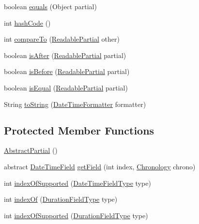 \begin{DoxyCompactItemize}
boolean \hyperlink{classorg_1_1joda_1_1time_1_1base_1_1_abstract_partial_abb989d9628c610b8eb46f92b2fe1c846}{equals} (Object partial)
\item 
int \hyperlink{classorg_1_1joda_1_1time_1_1base_1_1_abstract_partial_aa3435c9b8ceed4256678e3c666dd2ee1}{hash\-Code} ()
\item 
int \hyperlink{classorg_1_1joda_1_1time_1_1base_1_1_abstract_partial_a5fd48b43fedd6d26fa8c31cb4c20a107}{compare\-To} (\hyperlink{interfaceorg_1_1joda_1_1time_1_1_readable_partial}{Readable\-Partial} other)
\item 
boolean \hyperlink{classorg_1_1joda_1_1time_1_1base_1_1_abstract_partial_aca0ae287941e889d657f66e97fbed4f0}{is\-After} (\hyperlink{interfaceorg_1_1joda_1_1time_1_1_readable_partial}{Readable\-Partial} partial)
\item 
boolean \hyperlink{classorg_1_1joda_1_1time_1_1base_1_1_abstract_partial_a933d079d4a4c8c57fe8c229d93eb82d8}{is\-Before} (\hyperlink{interfaceorg_1_1joda_1_1time_1_1_readable_partial}{Readable\-Partial} partial)
\item 
boolean \hyperlink{classorg_1_1joda_1_1time_1_1base_1_1_abstract_partial_a006731cb214ca704c7e4e9c38dd149a5}{is\-Equal} (\hyperlink{interfaceorg_1_1joda_1_1time_1_1_readable_partial}{Readable\-Partial} partial)
\item 
String \hyperlink{classorg_1_1joda_1_1time_1_1base_1_1_abstract_partial_a81c28665ed42368cc92e5cb986d10e74}{to\-String} (\hyperlink{classorg_1_1joda_1_1time_1_1format_1_1_date_time_formatter}{Date\-Time\-Formatter} formatter)
\end{DoxyCompactItemize}
\subsection*{Protected Member Functions}
\begin{DoxyCompactItemize}
\item 
\hyperlink{classorg_1_1joda_1_1time_1_1base_1_1_abstract_partial_afe476faed2c22c47b54aa51d33c5c5bb}{Abstract\-Partial} ()
\item 
abstract \hyperlink{classorg_1_1joda_1_1time_1_1_date_time_field}{Date\-Time\-Field} \hyperlink{classorg_1_1joda_1_1time_1_1base_1_1_abstract_partial_af10925b28447f9040e75ca7b9bb37c9c}{get\-Field} (int index, \hyperlink{classorg_1_1joda_1_1time_1_1_chronology}{Chronology} chrono)
\item 
int \hyperlink{classorg_1_1joda_1_1time_1_1base_1_1_abstract_partial_af8cd6f36860b951533019a9f96c77021}{index\-Of\-Supported} (\hyperlink{classorg_1_1joda_1_1time_1_1_date_time_field_type}{Date\-Time\-Field\-Type} type)
\item 
int \hyperlink{classorg_1_1joda_1_1time_1_1base_1_1_abstract_partial_a96c870092b0d31c776dfd5f87e2c5d88}{index\-Of} (\hyperlink{classorg_1_1joda_1_1time_1_1_duration_field_type}{Duration\-Field\-Type} type)
\item 
int \hyperlink{classorg_1_1joda_1_1time_1_1base_1_1_abstract_partial_abcee8eca6a8c2e6288fe31df78370819}{index\-Of\-Supported} (\hyperlink{classorg_1_1joda_1_1time_1_1_duration_field_type}{Duration\-Field\-Type} type)
\end{DoxyCompactItemize}


